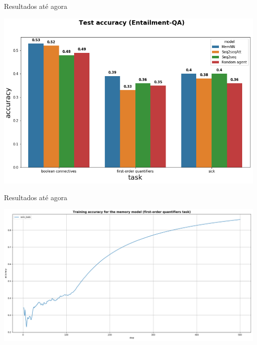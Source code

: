 \documentclass[10pt]{beamer}
\begin{document}
\begin{frame}{Resultados até agora}
\begin{center}
\includegraphics[scale=0.42]{images/comparative_results.png}
\end{center}
\end{frame}



\begin{frame}{Resultados até agora}
\begin{center}
\includegraphics[scale=0.28]{images/training_acc_EntailQA2_mem.png}
\end{center}
\end{frame}
\end{document}
